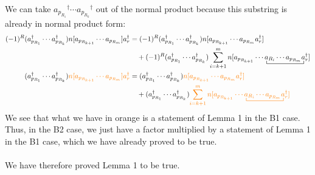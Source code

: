 \documentclass{article}
\newcommand{\ctr}{\bcontraction}
\newcommand{\dg}{\ensuremath{^\dagger} }
\newcommand{\cd}{\ensuremath{\cdots} }
\def\co#1{{\color{orange}#1}}
\begin{document}
We can take $a_{p_{R_1}}\dg \cd a_{p_{R_k}}\dg$ out of the normal product because this substring is already in normal product form:
\begin{align*}
(-1)^R (a_{p_{R_1}}\dg \cd a_{p_{R_k}}\dg)  n[a_{p_{R_{k+1}}} \cd a_{p_{R_m}}] a_r\dg 
&= (-1)^R  (a_{p_{R_1}}\dg \cd a_{p_{R_k}}\dg)  n[a_{p_{R_{k+1}}} \cd a_{p_{R_m}}  a_r\dg]  \\
&\quad+ (-1)^R  (a_{p_{R_1}}\dg \cd a_{p_{R_k}}\dg) \sum_{i=k+1}^m n[\ctr{ a_{p_{R_{k+1}}} \cd}{a}{{}_{R_i}\cd a_{p_{R_m}} }{a} a_{p_{R_{k+1}}} \cd a_{R_i}\cd a_{p_{R_m}} a_r\dg ]  \\
 (a_{p_{R_1}}\dg \cd a_{p_{R_k}}\dg)  \co{ n[a_{p_{R_{k+1}}} \cd a_{p_{R_m}}] a_r\dg }
&= (a_{p_{R_1}}\dg \cd a_{p_{R_k}}\dg) \co{ n[a_{p_{R_{k+1}}} \cd a_{p_{R_m}}  a_r\dg] } \\
&\quad+  (a_{p_{R_1}}\dg \cd a_{p_{R_k}}\dg) \co{\sum_{i=k+1}^m n[\ctr{ a_{p_{R_{k+1}}} \cd}{a}{{}_{R_i}\cd a_{p_{R_m}} }{a} a_{p_{R_{k+1}}} \cd a_{R_i}\cd a_{p_{R_m}} a_r\dg ] }
\end{align*}
We see that what we have in orange is a statement of Lemma 1 in the B1 case.
Thus, in the B2 case, we just have a factor multiplied by a statement of Lemma 1 in the B1 case, which we have already proved to be true.
\\ \\
We have therefore proved Lemma 1 to be true. 
\end{document}
